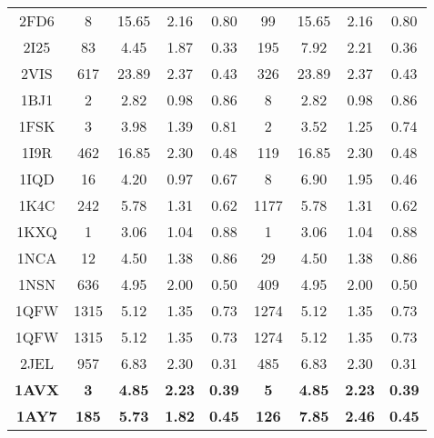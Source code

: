 \begin{longtable}{c c c c c|c c c c}
 {\tiny 2FD6} &{\tiny 8}&{\tiny 15.65}&{\tiny 2.16}&{\tiny 0.80} &{\tiny 99}&{\tiny 15.65}&{\tiny 2.16}&{\tiny 0.80}\\ 
 {\tiny 2I25} &{\tiny 83}&{\tiny 4.45}&{\tiny 1.87}&{\tiny 0.33} &{\tiny 195}&{\tiny 7.92}&{\tiny 2.21}&{\tiny 0.36}\\ 
 {\tiny 2VIS} &{\tiny 617}&{\tiny 23.89}&{\tiny 2.37}&{\tiny 0.43} &{\tiny 326}&{\tiny 23.89}&{\tiny 2.37}&{\tiny 0.43}\\ 
 {\tiny 1BJ1} &{\tiny 2}&{\tiny 2.82}&{\tiny 0.98}&{\tiny 0.86} &{\tiny 8}&{\tiny 2.82}&{\tiny 0.98}&{\tiny 0.86}\\ 
 {\tiny 1FSK} &{\tiny 3}&{\tiny 3.98}&{\tiny 1.39}&{\tiny 0.81} &{\tiny 2}&{\tiny 3.52}&{\tiny 1.25}&{\tiny 0.74}\\ 
 {\tiny 1I9R} &{\tiny 462}&{\tiny 16.85}&{\tiny 2.30}&{\tiny 0.48} &{\tiny 119}&{\tiny 16.85}&{\tiny 2.30}&{\tiny 0.48}\\ 
 {\tiny 1IQD} &{\tiny 16}&{\tiny 4.20}&{\tiny 0.97}&{\tiny 0.67} &{\tiny 8}&{\tiny 6.90}&{\tiny 1.95}&{\tiny 0.46}\\ 
 {\tiny 1K4C} &{\tiny 242}&{\tiny 5.78}&{\tiny 1.31}&{\tiny 0.62} &{\tiny 1177}&{\tiny 5.78}&{\tiny 1.31}&{\tiny 0.62}\\ 
 {\tiny 1KXQ} &{\tiny 1}&{\tiny 3.06}&{\tiny 1.04}&{\tiny 0.88} &{\tiny 1}&{\tiny 3.06}&{\tiny 1.04}&{\tiny 0.88}\\ 
 {\tiny 1NCA} &{\tiny 12}&{\tiny 4.50}&{\tiny 1.38}&{\tiny 0.86} &{\tiny 29}&{\tiny 4.50}&{\tiny 1.38}&{\tiny 0.86}\\ 
 {\tiny 1NSN} &{\tiny 636}&{\tiny 4.95}&{\tiny 2.00}&{\tiny 0.50} &{\tiny 409}&{\tiny 4.95}&{\tiny 2.00}&{\tiny 0.50}\\ 
 {\tiny 1QFW} &{\tiny 1315}&{\tiny 5.12}&{\tiny 1.35}&{\tiny 0.73} &{\tiny 1274}&{\tiny 5.12}&{\tiny 1.35}&{\tiny 0.73}\\ 
 {\tiny 1QFW} &{\tiny 1315}&{\tiny 5.12}&{\tiny 1.35}&{\tiny 0.73} &{\tiny 1274}&{\tiny 5.12}&{\tiny 1.35}&{\tiny 0.73}\\ 
 {\tiny 2JEL} &{\tiny 957}&{\tiny 6.83}&{\tiny 2.30}&{\tiny 0.31} &{\tiny 485}&{\tiny 6.83}&{\tiny 2.30}&{\tiny 0.31}\\ 
 \textbf{\tiny 1AVX} &\textbf{\tiny 3}&\textbf{\tiny 4.85}&\textbf{\tiny 2.23}&\textbf{\tiny 0.39} &\textbf{\tiny 5}&\textbf{\tiny 4.85}&\textbf{\tiny 2.23}&\textbf{\tiny 0.39}\\ 
 \textbf{\tiny 1AY7} &\textbf{\tiny 185}&\textbf{\tiny 5.73}&\textbf{\tiny 1.82}&\textbf{\tiny 0.45} &\textbf{\tiny 126}&\textbf{\tiny 7.85}&\textbf{\tiny 2.46}&\textbf{\tiny 0.45}\\ 

\end{longtable}
